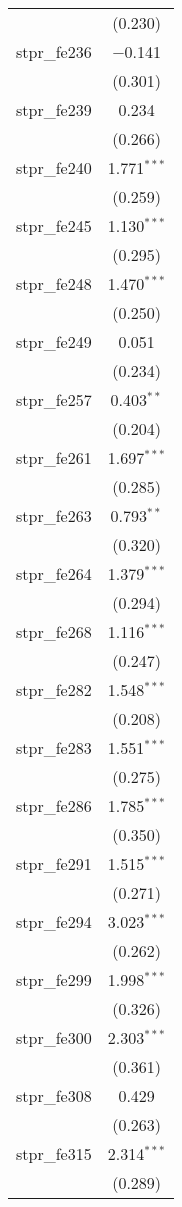 \begin{table}[!htbp]
\begin{tabular}{@{\extracolsep{5pt}}lc}
  & (0.230) \\ 
  stpr\_fe236 & $-$0.141 \\ 
  & (0.301) \\ 
  stpr\_fe239 & 0.234 \\ 
  & (0.266) \\ 
  stpr\_fe240 & 1.771$^{***}$ \\ 
  & (0.259) \\ 
  stpr\_fe245 & 1.130$^{***}$ \\ 
  & (0.295) \\ 
  stpr\_fe248 & 1.470$^{***}$ \\ 
  & (0.250) \\ 
  stpr\_fe249 & 0.051 \\ 
  & (0.234) \\ 
  stpr\_fe257 & 0.403$^{**}$ \\ 
  & (0.204) \\ 
  stpr\_fe261 & 1.697$^{***}$ \\ 
  & (0.285) \\ 
  stpr\_fe263 & 0.793$^{**}$ \\ 
  & (0.320) \\ 
  stpr\_fe264 & 1.379$^{***}$ \\ 
  & (0.294) \\ 
  stpr\_fe268 & 1.116$^{***}$ \\ 
  & (0.247) \\ 
  stpr\_fe282 & 1.548$^{***}$ \\ 
  & (0.208) \\ 
  stpr\_fe283 & 1.551$^{***}$ \\ 
  & (0.275) \\ 
  stpr\_fe286 & 1.785$^{***}$ \\ 
  & (0.350) \\ 
  stpr\_fe291 & 1.515$^{***}$ \\ 
  & (0.271) \\ 
  stpr\_fe294 & 3.023$^{***}$ \\ 
  & (0.262) \\ 
  stpr\_fe299 & 1.998$^{***}$ \\ 
  & (0.326) \\ 
  stpr\_fe300 & 2.303$^{***}$ \\ 
  & (0.361) \\ 
  stpr\_fe308 & 0.429 \\ 
  & (0.263) \\ 
  stpr\_fe315 & 2.314$^{***}$ \\ 
  & (0.289) \\ 

\end{tabular}
\end{table}
